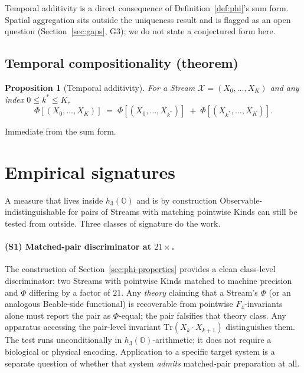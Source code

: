 \documentclass[12pt]{article}
\newtheorem{proposition}[theorem]{Proposition}
\theoremstyle{remark}
\newcommand{\hthree}{h_3(\mathbb{O})}
\newcommand{\Ffour}{F_4}
\newcommand{\Phiexp}{\Phi}
\newcommand{\Stream}{\mathcal{X}}
\newcommand{\Tr}{\mathrm{Tr}}
\begin{document}
Temporal additivity is a direct consequence of
Definition~\ref{def:phi}'s sum form. Spatial aggregation sits
outside the uniqueness result and is flagged as an open question
(Section~\ref{sec:gaps}, G3); we do not state a conjectured form
here.

\subsection{Temporal compositionality (theorem)}
\label{sec:temporal-composition}

\begin{proposition}[Temporal additivity]\label{prop:temporal-add}
For a Stream $\Stream = (X_0, \ldots, X_K)$ and any index $0 \leq k^* \leq K$,
\begin{equation}\label{eq:temporal-add}
  \Phiexp[(X_0, \ldots, X_K)]
  \;=\; \Phiexp[(X_0, \ldots, X_{k^*})]
  \;+\; \Phiexp[(X_{k^*}, \ldots, X_K)].
\end{equation}
\end{proposition}

\noindent
Immediate from the sum form.


\section{Empirical signatures}
\label{sec:signatures}

A measure that lives inside $\hthree$ and is by construction
Observable-indistinguishable for pairs of Streams with matching
pointwise Kinds can still be tested from outside. Three classes of
signature do the work.

\paragraph{(S1) Matched-pair discriminator at $21\times$.}
The construction of Section~\ref{sec:phi-properties} provides a
clean class-level discriminator: two Streams with pointwise Kinds
matched to machine precision and $\Phiexp$ differing by a factor
of $21$. Any \emph{theory} claiming that a Stream's $\Phiexp$ (or
an analogous Beable-side functional) is recoverable from pointwise
$\Ffour$-invariants alone must report the pair as $\Phiexp$-equal;
the pair falsifies that theory class. Any apparatus accessing the
pair-level invariant $\Tr(X_k \cdot X_{k+1})$ distinguishes them.
The test runs unconditionally in $\hthree$-arithmetic; it does not
require a biological or physical encoding. Application to a
specific target system is a separate question of whether that
system \emph{admits} matched-pair preparation at all.
\end{document}
